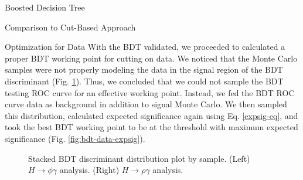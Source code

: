 \begin{section}{Boosted Decision Tree}
\begin{subsection}{Comparison to Cut-Based Approach}
\end{subsection}
\begin{subsection}{Optimization for Data}\label{optim-for-data}
With the BDT validated, we proceeded to calculated a proper BDT working point for cutting on data. We noticed that the Monte Carlo samples were not properly modeling the data in the signal region of the BDT discriminant (Fig. \ref{fig:bdt-thresh-dist}). Thus, we concluded that we could not sample the BDT testing ROC curve for an effective working point. Instead, we fed the BDT ROC curve data as background in addition to signal Monte Carlo. We then sampled this distribution, calculated expected significance again using Eq. \ref{expsig-eq}, and took the best BDT working point to be at the threshold with maximum expected significance (Fig. \ref{fig:bdt-data-expsig}).

\begin{figure}[htb]
\begin{center}
\quad
{}
\end{center}
\caption{Stacked BDT discriminant distribution plot by sample. (Left) $H\rightarrow\phi\gamma$ analysis. (Right) $H\rightarrow\rho\gamma$ analysis.}
\label{fig:bdt-thresh-dist}
\end{figure}

\end{subsection}
\end{section}

